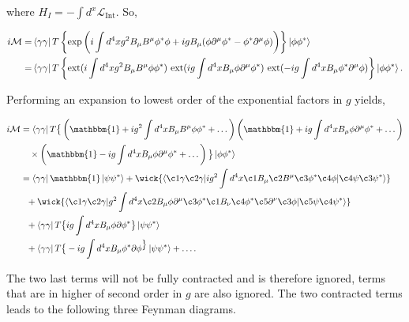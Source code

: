 \documentclass[11pt, a4paper]{amsart}
\begin{document}
where $H_I = -\int d^x \mathcal{L}_{\text{Int}}$. So,

\begin{align*}
i \mathcal{M} = &\bra{\gamma\gamma} T \left\{\text{exp} \left( i \int d^4x g^2 B_\mu B^\mu \phi^* \phi + ig B_\mu (\phi \partial^\mu \phi^* - \phi^*\partial^\mu \phi) \right) \right\} \ket{\phi\phi^*} \\
	= &\bra{\gamma\gamma}T \left\{\text{ext}(i\int d^4xg^2B_\mu B^\mu \phi\phi^*)\ \text{ext} (ig \int d^4xB_\mu \phi \partial^\mu \phi^*)\ \text{ext} (-ig \int d^4xB_\mu \phi^* \partial^\mu \phi) \right\}\ket{\phi\phi^*}.
\end{align*}

Performing an expansion to lowest order of the exponential factors in $g$ yields,

\begin{align*}
i\mathcal{M} &= \bra{\gamma\gamma} T \big\{
		\left(\mathbbm{1} + ig^2 \int d^4x B_\mu B^\mu\phi\phi^* + \dots \right)
		\left(\mathbbm{1} + ig  \int d^4x B_\mu \phi \partial^\mu \phi^* + \dots \right) \\
		& \quad \times		
		\left(\mathbbm{1} - ig   \int d^4x B_\mu \phi \partial^\mu \phi^* + \dots  \right)		
		\big\}
		\ket{\phi\phi^*} \\
		&= \bra{\gamma\gamma} \mathbbm{1} \ket{\psi\psi^*} 
		+ \wick{\langle \c1 \gamma \c2 \gamma | ig^2 \int d^4x \c1 B_\mu \c2 B^\mu \c3 \phi^* \c4 \phi | \c4 \psi \c3 \psi^* \rangle } \\
		&\ \ + \wick{\langle\c1\gamma\c2\gamma|g^2 \int d^4x \c2 B_\mu \phi\partial^\mu \c3 \phi^* \c1 B_\nu \c4 \phi^* \c5 \partial^\nu \c3 \phi |\c5 \psi \c4 \psi^*\rangle} \\
		&\ \ + \bra{\gamma\gamma}T\big\{ ig \int d^4x B_\mu \phi \partial \phi^* \big\} \ket{\psi\psi^*} \\
		&\ \ + \bra{\gamma\gamma}T\big\{ -ig \int d^4x B_\mu \phi^* \partial \phi^ \big\} \ket{\psi\psi^*}  + \dots.
\end{align*} 

The two last terms will not be fully contracted and is therefore ignored, terms that are in higher of second order in $g$ are also ignored. The two contracted terms leads to the following three Feynman diagrams.
\end{document}
